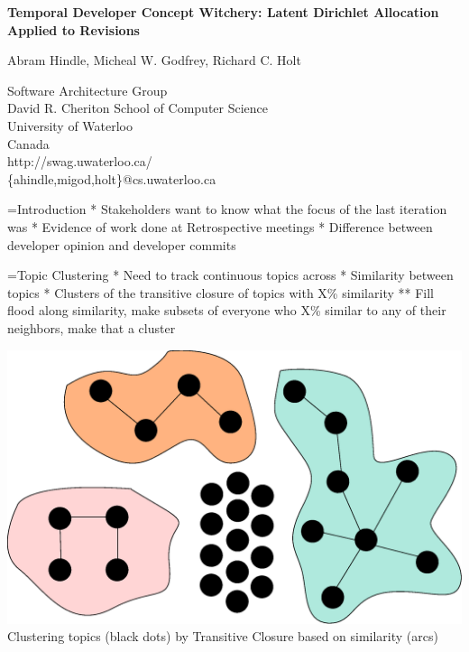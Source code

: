 \documentclass[titlepage,usenames,a4,landscape,semhelv]{seminar}
\author{
\names \\ 
{\small Software Architecture Group }\\
\small David R. Cheriton School of Computer Science\\
\small University of Waterloo\\
\small Canada\\
ahindle@cs.uwaterloo.ca
}
\newcommand{\gettitle}{Temporal Developer Concept Witchery: Latent Dirichlet Allocation Applied to Revisions}
\newcommand{\gettitleproper}{\gettitle}
\newcommand{\names}{Abram Hindle, Micheal W. Godfrey, Richard C. Holt}
\begin{document}
\pagestyle{fancy} %
\begin{slide}

\begin{center}
{\bf \LARGE \gettitleproper }

{\names } 

{\small Software Architecture Group }\\[-.5em]
{\small David R. Cheriton School of Computer Science}\\[-.5em]
{\small University of Waterloo}\\[-.5em]
{\small Canada}\\[-.5em]
{\small http://swag.uwaterloo.ca/}\\
\{ahindle,migod,holt\}@cs.uwaterloo.ca


\end{center}

=Introduction
* Stakeholders want to know what the focus of the last iteration was
* Evidence of work done at Retrospective meetings
* Difference between developer opinion and developer commits

=Topic Clustering 
* Need to track continuous topics across 
* Similarity between topics
* Clusters of the transitive closure of topics with X\% similarity
** Fill flood along similarity, make subsets of everyone who X\% similar to any of their neighbors, make that a cluster

\newslide


\begin{center}
\includegraphics[width=\textwidth]{transitiveclosure}
Clustering topics (black dots) by Transitive Closure based on similarity (arcs)
\end{center}



\end{slide}
\end{document}
